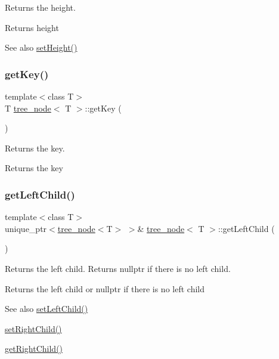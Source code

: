 Returns the height. \begin{DoxyReturn}{Returns}
height 
\end{DoxyReturn}
\begin{DoxySeeAlso}{See also}
\hyperlink{classtree__node_a159ebd6d96c0e2111eb0ef6a36d50471}{set\+Height()} 
\end{DoxySeeAlso}
\mbox{\label{classtree__node_afbe2d91ad009570338290ed9eb8a7485}} 
\subsubsection{\texorpdfstring{get\+Key()}{getKey()}}
{\footnotesize\ttfamily template$<$class T$>$ \\
T \hyperlink{classtree__node}{tree\+\_\+node}$<$ T $>$\+::get\+Key (\begin{DoxyParamCaption}{ }\end{DoxyParamCaption})\hspace{0.3cm}{\ttfamily [inline]}}

Returns the key. \begin{DoxyReturn}{Returns}
the key 
\end{DoxyReturn}
\mbox{\label{classtree__node_ae161b70a3780e0cb3ecd4b57acc9e2d1}} 
\subsubsection{\texorpdfstring{get\+Left\+Child()}{getLeftChild()}}
{\footnotesize\ttfamily template$<$class T$>$ \\
unique\+\_\+ptr$<$\hyperlink{classtree__node}{tree\+\_\+node}$<$T$>$ $>$\& \hyperlink{classtree__node}{tree\+\_\+node}$<$ T $>$\+::get\+Left\+Child (\begin{DoxyParamCaption}{ }\end{DoxyParamCaption})\hspace{0.3cm}{\ttfamily [inline]}}

Returns the left child. Returns nullptr if there is no left child. \begin{DoxyReturn}{Returns}
the left child or nullptr if there is no left child 
\end{DoxyReturn}
\begin{DoxySeeAlso}{See also}
\hyperlink{classtree__node_a3db979969a0fe8505ba65c7afabb5463}{set\+Left\+Child()} 

\hyperlink{classtree__node_afea4c6595dafba65b5c4e59ca3da30f3}{set\+Right\+Child()} 

\hyperlink{classtree__node_a5e584d47f2c11941fe0406836fe50159}{get\+Right\+Child()} 
\end{DoxySeeAlso}
\mbox{\label{classtree__node_a70bdade8011a6a46b083ea680fcea52f}} 
